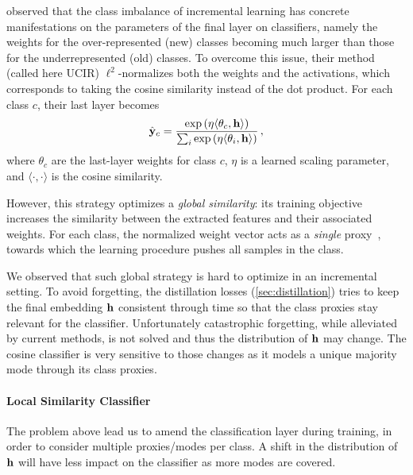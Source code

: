 \cite{hou2019ucir} observed that the class imbalance of incremental learning has
concrete manifestations on the parameters of the final layer on classifiers, namely the weights for
the over-represented (new) classes becoming much larger than those for the underrepresented (old)
classes. To overcome this issue, their method (called here UCIR) $\ell^2$-normalizes both the
weights and the activations, which corresponds to taking the cosine similarity instead of the dot
product. For each class $c$, their last layer becomes
%
\begin{equation}
    \hat{\mathbf{y}}_{c}=\frac{\exp\left(\eta\langle\theta_{c},\mathbf{h}\rangle\right)}{\sum_{i} \exp \left(\eta\langle\theta_{i}, \mathbf{h}\rangle\right)}\,,
\end{equation}
%
where $\theta_c$ are the last-layer weights for class $c$, $\eta$ is a learned scaling parameter,
and $\langle\cdot,\cdot\rangle$ is the cosine similarity.

However, this strategy optimizes a \textit{global similarity}: its training objective increases the
similarity between the extracted features and their associated weights. For each class, the
normalized weight vector acts as a \textit{single} proxy~\citep{attias2017proxynca}, towards which
the learning procedure pushes all samples in the class.

We observed that such global strategy is hard to optimize in an incremental setting. To avoid
forgetting, the distillation losses (\autoref{sec:distillation}) tries to keep the final embedding
$\mathbf{h}$ consistent through time so that the class proxies stay relevant for the classifier.
Unfortunately catastrophic forgetting, while alleviated by current methods, is not solved and thus
the distribution of $\mathbf{h}$ may change. The cosine classifier is very sensitive to those changes as it
models a unique majority mode through its class proxies.


\paragraph{Local Similarity Classifier} The problem above lead us to amend the classification layer
during training, in order to consider multiple proxies/modes per class. A shift in the distribution
of $\mathbf{h}$ will have less impact on the classifier as more modes are covered.


